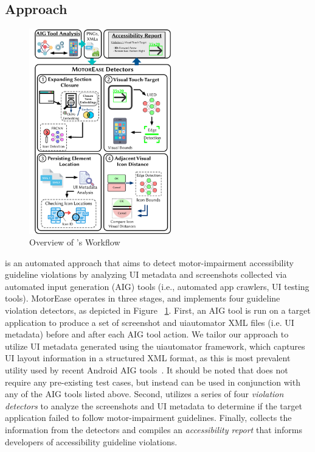 \subsection{\MotorEase Approach}


\begin{figure}[t]
	\centering
    \includegraphics[width=0.55\textwidth]{imgs/MotorEaseOverview.pdf}
    \caption{Overview of \MotorEase's Workflow}
    \label{fig:overview}
\end{figure}

\MotorEase is an automated approach that aims to detect motor-impairment accessibility guideline violations by analyzing UI metadata and screenshots collected via automated input generation (AIG) tools (i.e., automated app crawlers, UI testing tools). MotorEase operates in three stages, and implements four guideline violation detectors, as depicted in Figure ~\ref{fig:overview}. First, an AIG tool is run on a target application to produce a set of screenshot and uiautomator XML files (i.e. UI metadata) before and after each AIG tool action. We tailor our approach to utilize UI metadata generated using the uiautomator framework, which captures UI layout information in a structured XML format, as this is most prevalent utility used by recent Android AIG tools~\cite{mao2016sapienz,li2017droidbot,Gu:ICSE'19,Moran:ICST'16,crashscope,Su:FSE'17,Linares:MSR15,Linares:ICSME'17,Linares:ICSME'17-2,Zhao:FSE22}. It should be noted that \MotorEase does not require any pre-existing test cases, but instead can be used in conjunction with any of the AIG tools listed above. Second, \MotorEase utilizes a series of four \textit{violation detectors} to analyze the screenshots and UI metadata to determine if the target application failed to follow motor-impairment guidelines. Finally, \MotorEase collects the information from the detectors and compiles an \textit{accessibility report} that informs developers of accessibility guideline violations.



